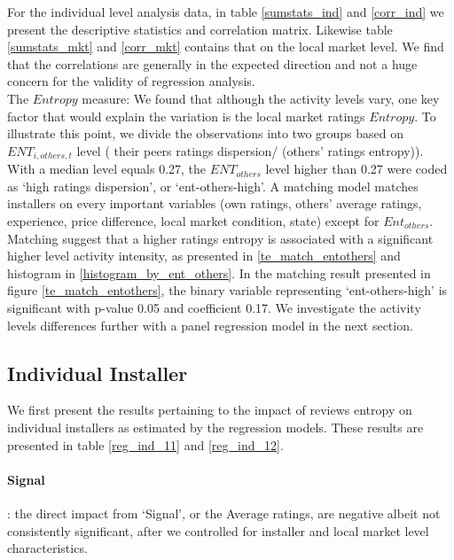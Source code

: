 \documentclass[msom,blindrev]{informs3}
\begin{document}
For the individual level analysis data, in table \ref{sumstats_ind} and \ref{corr_ind} we present the descriptive statistics and correlation matrix.  Likewise table \ref{sumstats_mkt} and \ref{corr_mkt} contains that on the local market level. We find that the correlations are generally in the expected direction and not a huge concern for the validity of regression analysis. \\
 The $Entropy$ measure: We found that although the activity levels vary, one key factor that would explain the variation is the local market ratings $Entropy$. To illustrate this point, we divide the observations into two groups based on $ENT_{i,others,t}$ level ( their peers ratings dispersion/ (others' ratings entropy)).  With a median level equals 0.27, the $ENT_{others}$ level higher than 0.27 were coded as `high ratings dispersion', or `ent-others-high'.
 A matching model matches installers on every important variables (own ratings, others' average ratings, experience, price difference, local market condition, state) except for $Ent_{others}$. Matching suggest that a higher ratings entropy is associated with a significant higher level activity intensity, as presented in \ref{te_match_entothers} and histogram in \ref{histogram_by_ent_others}. In the matching result presented in figure \ref{te_match_entothers}, the binary variable representing `ent-others-high' is significant with p-value 0.05 and coefficient 0.17.  We investigate the activity levels differences further with a panel regression model in the next section.  \\ 







\subsection{Individual Installer}






We first present the results pertaining to the impact of reviews entropy on individual installers as estimated by the regression models. These results are presented in table \ref{reg_ind_11} and \ref{reg_ind_12}.  
\paragraph{Signal}: the direct impact from `Signal', or the Average ratings, are negative albeit not consistently significant, after we controlled for installer and local market level characteristics. 
\end{document}
